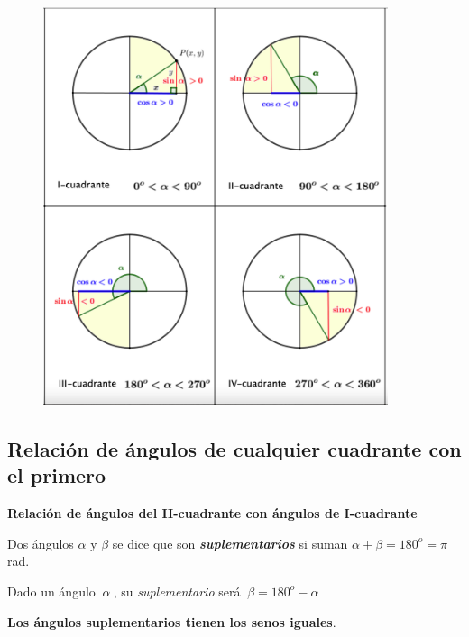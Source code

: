 \begin{figure}[H]
	\centering
	\includegraphics[width=0.9\textwidth]{img-rt/rt07.png}
\end{figure}







\subsection{Relación de ángulos de cualquier cuadrante con el primero}
\vspace{0.5cm}

\begin{large}\textbf{Relación de ángulos del  II-cuadrante con ángulos de I-cuadrante}\end{large}

\vspace{3mm}
\begin{theorem}

Dos ángulos $\alpha$ y $\beta$	se dice que son \emph{\textbf{suplementarios}} si suman $\alpha+\beta=180^o = \pi $ rad.

\vspace{2mm} Dado un ángulo $\ \alpha\ $, su \emph{suplementario} será $\  \beta=180^o-\alpha$

\vspace{2mm}\textbf{Los ángulos suplementarios tienen los senos iguales}.
\end{theorem}



